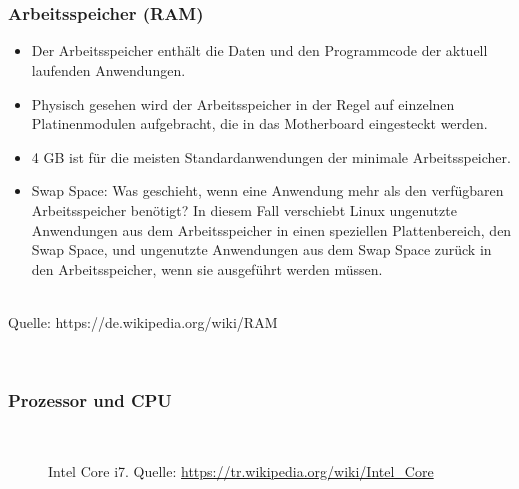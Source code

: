 ~\\~\\
\begin{minipage}[t]{0.7\textwidth}
	\subsubsection{Arbeitsspeicher (RAM)}
	\begin{itemize}
		\item Der Arbeitsspeicher enthält die Daten und den Programmcode der aktuell laufenden Anwendungen.
		\item Physisch gesehen wird der Arbeitsspeicher in der Regel auf einzelnen Platinenmodulen aufgebracht, die in das Motherboard eingesteckt werden.
		\item  4 GB ist für die meisten Standardanwendungen der minimale Arbeitsspeicher.
		\item Swap Space: Was geschieht, wenn eine Anwendung mehr als den verfügbaren Arbeitsspeicher benötigt? In diesem Fall verschiebt Linux ungenutzte Anwendungen aus dem Arbeitsspeicher in einen speziellen Plattenbereich, den Swap Space, und ungenutzte Anwendungen aus dem Swap Space zurück in den Arbeitsspeicher, wenn sie ausgeführt werden müssen.
	\end{itemize}
\end{minipage}
\begin{minipage}[t]{0.3\textwidth}
\centering
~\\
\tiny
Quelle: https://de.wikipedia.org/wiki/RAM
\end{minipage}
%
%
~\\
\subsubsection{Prozessor und CPU}
\begin{figure}[h!]
	\centering
	~\\
\caption[Intel Core i7]{	Intel Core i7.
	Quelle: \url{https://tr.wikipedia.org/wiki/Intel_Core}}
\end{figure}

